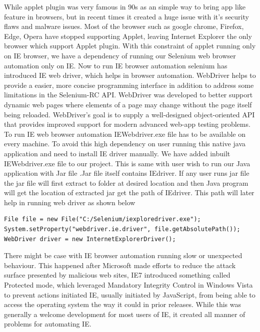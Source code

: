 \documentclass[article,type=msc,colorback,accentcolor=tud9c,twoside,11pt]{tudthesis}
\begin{document}
While applet plugin was very famous in 90s as an simple way to bring app like feature in browsers, but in recent times it created a huge issue with it's security flaws and malware issues. Most of the browser such as google chrome, Firefox, Edge, Opera have stopped supporting Applet, leaving Internet Explorer the only browser which support Applet plugin.
With this constraint of applet running only on IE browser, we have a dependency of running our Selenium web browser automation only on IE. Now to run IE browser automation selenium has introduced IE web driver, which helps in browser automation. WebDriver helps to provide a easier, more concise programming interface in addition to address some limitations in the Selenium-RC API. WebDriver was developed to better support dynamic web pages where elements of a page may change without the page itself being reloaded. WebDriver's goal is to supply a well-designed object-oriented API that provides improved support for modern advanced web-app testing problems. To run IE web browser automation IEWebdriver.exe file has to be available on every machine. To avoid this high dependency on user running this native java application and need to install IE driver manually. We have added inbuilt IEWebdriver.exe file to our project. This is same with user wish to run our Java application with Jar file .Jar file itself contains IEdriver. If any user runs jar file the jar file will first extract to folder at desired location and then Java program will get the location of extracted jar get the path of IEdriver. This path will later help in running web driver as shown below
\begin{lstlisting}
File file = new File("C:/Selenium/iexploredriver.exe");
System.setProperty("webdriver.ie.driver", file.getAbsolutePath());
WebDriver driver = new InternetExplorerDriver();
\end{lstlisting}
There might be case with IE browser automation running slow or unexpected behaviour. This happened after Microsoft made efforts to reduce the attack surface presented by malicious web sites, IE7 introduced something called Protected mode, which leveraged Mandatory Integrity Control in Windows Vista to prevent actions initiated IE, usually initiated by JavaScript, from being able to access the operating system the way it could in prior releases. While this was generally a welcome development for most users of IE, it created all manner of problems for automating IE.
\end{document}
